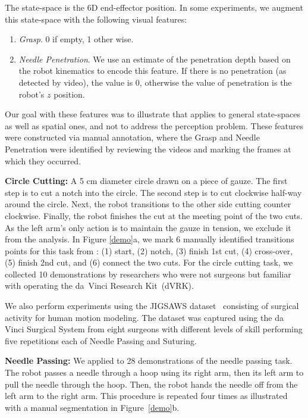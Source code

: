 The state-space is the 6D end-effector position.
In some experiments, we augment this state-space with the following visual features:
\begin{enumerate}
\item \emph{Grasp}. 0 if empty, 1 other wise.
\item \emph{Needle Penetration}. We use an estimate of the penetration depth based on the robot kinematics to encode this feature. 
If there is no penetration (as detected by video), the value is 0, otherwise the value of penetration is the robot's $z$ position.
\end{enumerate}
Our goal with these features was to illustrate that \tsc applies to general state-spaces as well as spatial ones, and not to address the perception problem.
These features were constructed via manual annotation, where the Grasp and Needle Penetration were identified by reviewing the videos and marking the frames at which they occurred.

\vspace{0.5em}

\noindent\textbf{Circle Cutting: }
A 5 cm diameter circle drawn on a piece of gauze.
The first step is to cut a notch into the circle.
The second step is to cut clockwise half-way around the circle.
Next, the robot transitions to the other side cutting counter clockwise.
Finally, the robot finishes the cut at the meeting point of the two cuts.
As the left arm's only action is to maintain the gauze in tension, we exclude it from the analysis. 
In Figure \ref{demo}a, we mark 6 manually identified transitions points for this task from \cite{murali2015learning}: (1) start, (2) notch, (3) finish 1st cut, (4) cross-over, (5) finish 2nd cut, and (6) connect the two cuts.
For the circle cutting task, we collected 10 demonstrations by researchers who were not surgeons but familiar with operating the da~Vinci Research Kit~(dVRK).

\vspace{0.5em}
We also perform experiments using the JIGSAWS dataset~\cite{gao2014jigsaws} consisting of surgical activity for human motion modeling. The dataset was captured using the da Vinci Surgical System from eight surgeons with different levels of skill performing five repetitions each of Needle Passing and Suturing.

\vspace{0.5em}

\noindent\textbf{Needle Passing: } We applied \tsc to 28 demonstrations of the needle passing task.
The robot passes a needle through a hoop using its right arm, then its left arm to pull the needle through the hoop. Then, the robot hands the needle off from the left arm to the right arm. This procedure is repeated four times as illustrated with a manual segmentation in Figure~\ref{demo}b.

